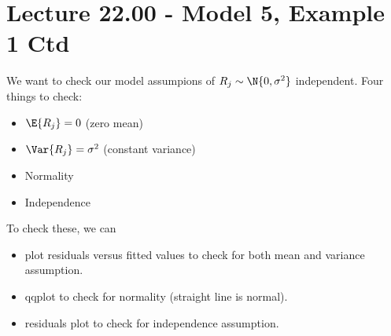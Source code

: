 \section{Lecture 22.00 - Model 5, Example 1 Ctd}
We want to check our model assumpions of
$ R_j \sim \N{0,\sigma^2} $ independent. Four things to check:
\begin{itemize}
    \item $ \E{R_j}=0 $ (zero mean)
    \item $ \Var{R_j}=\sigma^2 $ (constant variance)
    \item Normality
    \item Independence
\end{itemize}
To check these, we can
\begin{itemize}
    \item plot residuals versus fitted values to check for both
          mean and variance assumption.

    \item qqplot to check for normality (straight line is normal).

    \item residuals plot to check for independence assumption.

\end{itemize}


